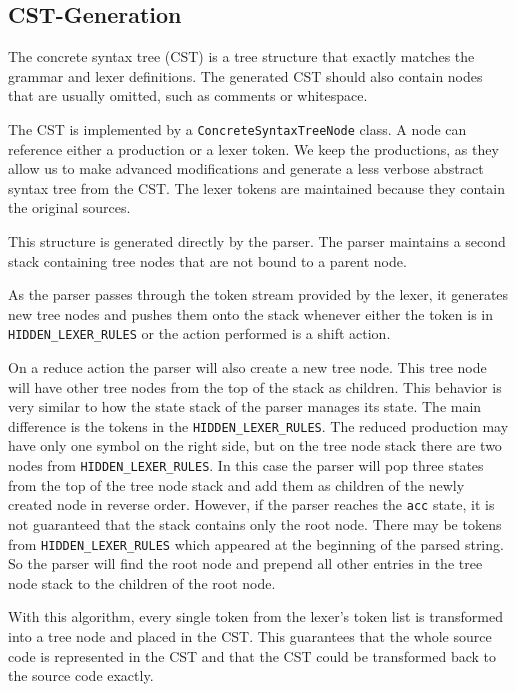 \subsection{CST-Generation}
The concrete syntax tree (CST) is a tree structure that exactly matches the grammar and lexer definitions. 
The generated CST should also contain nodes that are usually omitted, such as comments or whitespace.

The CST is implemented by a \verb|ConcreteSyntaxTreeNode| class. 
A node can reference either a production or a lexer token. 
We keep the productions, as they allow us to make advanced modifications and generate a less verbose abstract syntax tree from the CST. 
The lexer tokens are maintained because they contain the original sources.

This structure is generated directly by the parser. 
The parser maintains a second stack containing tree nodes that are not bound to a parent node.

As the parser passes through the token stream provided by the lexer, 
it generates new tree nodes and pushes them onto the stack whenever either the token is in \verb|HIDDEN_LEXER_RULES| or the action performed is a shift action. 

On a reduce action the parser will also create a new tree node. 
This tree node will have other tree nodes from the top of the stack as children. 
This behavior is very similar to how the state stack of the parser manages its state. 
The main difference is the tokens in the \verb|HIDDEN_LEXER_RULES|. 
The reduced production may have only one symbol on the right side, but on the tree node stack there are two nodes from \verb|HIDDEN_LEXER_RULES|. 
In this case the parser will pop three states from the top of the tree node stack and add them as children of the newly created node in reverse order. 
However, if the parser reaches the \verb|acc| state, it is not guaranteed that the stack contains only the root node. 
There may be tokens from \verb|HIDDEN_LEXER_RULES| which appeared at the beginning of the parsed string. 
So the parser will find the root node and prepend all other entries in the tree node stack to the children of the root node. 

With this algorithm, every single token from the lexer's token list is transformed into a tree node and placed in the CST. 
This guarantees that the whole source code is represented in the CST and that the CST could be transformed back to the source code exactly.